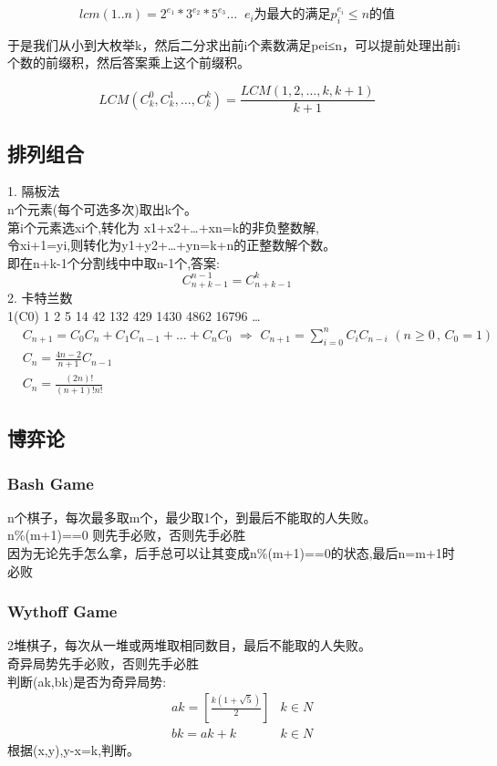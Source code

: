 \documentclass{article}
\begin{document}
$$lcm(1..n) = 2^{e_1} * 3^{e_2} * 5^{e_3} … \;\; e_i \text{为最大的满足} p_i^{e_i} \le n \text{的值}$$

于是我们从小到大枚举k，然后二分求出前i个素数满足pei≤n，可以提前处理出前i个数的前缀积，然后答案乘上这个前缀积。 

$$LCM(C_k^0,C_k^1,…,C_k^k) = \frac{LCM(1,2,…,k,k+1)}{k+1}$$
\newpage
\subsection{排列组合}
1. 隔板法	\\
n个元素(每个可选多次)取出k个。	\\
第i个元素选xi个,转化为 x1+x2+…+xn=k的非负整数解,		\\
令xi+1=yi,则转化为y1+y2+…+yn=k+n的正整数解个数。		\\
即在n+k-1个分割线中中取n-1个,答案:
$$C_{n+k-1}^{n-1}=C_{n+k-1}^{k}$$
2. 卡特兰数	\\
1(C0) 1 2 5 14 42 132 429 1430 4862 16796 …	\\
$$\begin{aligned}
&C_{n+1}=C_0C_n+C_1C_{n-1}+…+C_nC_0 \,\, \Rightarrow  \,\, C_{n+1}= \sum_{i=0}^n C_iC_{n-i} \,\, (n \ge 0 \, , \,C_0=1)	\\
&C_{n}=\frac{4n-2}{n+1}C_{n-1}	\\
&C_n=\frac{(2n)!}{(n+1)!n!}
\end{aligned}
$$
\newpage
\subsection{博弈论}

\subsubsection{Bash Game}

n个棋子，每次最多取m个，最少取1个，到最后不能取的人失败。\\
n\%(m+1)==0 则先手必败，否则先手必胜	\\
因为无论先手怎么拿，后手总可以让其变成n\%(m+1)==0的状态,最后n=m+1时必败	\\

\subsubsection{Wythoff Game}

2堆棋子，每次从一堆或两堆取相同数目，最后不能取的人失败。	\\
奇异局势先手必败，否则先手必胜							 \\
判断(ak,bk)是否为奇异局势:							 \\
$$\begin{aligned} 
&ak = [\frac{k(1+\sqrt{5})}{2}] &  k \in N \\ 
&bk = ak + k                    &  k \in N 
\end{aligned}
$$
根据(x,y),y-x=k,判断。	\\
\end{document}
